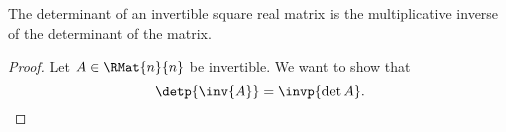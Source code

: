 


\begin{prop}

The determinant of an invertible square real matrix is the multiplicative inverse of the determinant of the matrix.

\begin{proof}

Let $A \in \RMat{n}{n}$ be invertible.  We want to show that
$$ \detp{\inv{A}} = \invp{\det A}.$$

\end{proof}

\end{prop}
